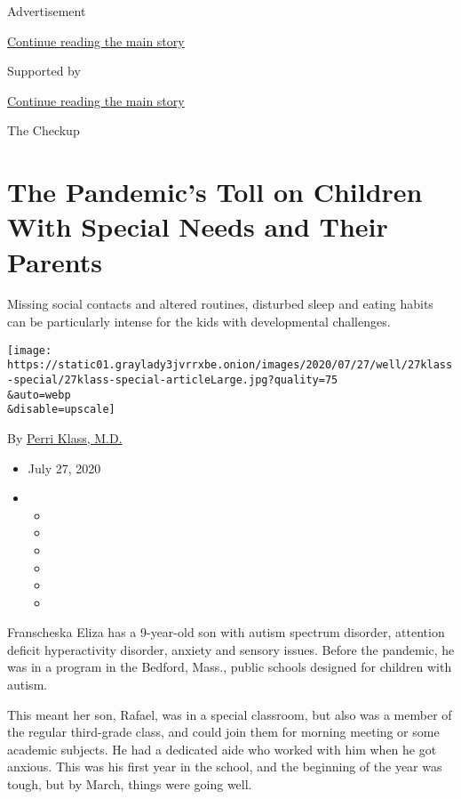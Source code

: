 Advertisement

\protect\hyperlink{after-top}{Continue reading the main story}

Supported by

\protect\hyperlink{after-sponsor}{Continue reading the main story}

The Checkup

\hypertarget{the-pandemics-toll-on-children-with-special-needs-and-their-parents}{%
\section{The Pandemic's Toll on Children With Special Needs and Their
Parents}\label{the-pandemics-toll-on-children-with-special-needs-and-their-parents}}

Missing social contacts and altered routines, disturbed sleep and eating
habits can be particularly intense for the kids with developmental
challenges.

\texttt{[image: https://static01.graylady3jvrrxbe.onion/images/2020/07/27/well/27klass-special/27klass-special-articleLarge.jpg?quality=75\\\&auto=webp\\\&disable=upscale]}

By \href{https://www.nytimes3xbfgragh.onion/by/perri-klass-md}{Perri
Klass, M.D.}

\begin{itemize}
\item
  July 27, 2020
\item
  \begin{itemize}
  \item
  \item
  \item
  \item
  \item
  \item
  \end{itemize}
\end{itemize}

Franscheska Eliza has a 9-year-old son with autism spectrum disorder,
attention deficit hyperactivity disorder, anxiety and sensory issues.
Before the pandemic, he was in a program in the Bedford, Mass., public
schools designed for children with autism.

This meant her son, Rafael, was in a special classroom, but also was a
member of the regular third-grade class, and could join them for morning
meeting or some academic subjects. He had a dedicated aide who worked
with him when he got anxious. This was his first year in the school, and
the beginning of the year was tough, but by March, things were going
well.

